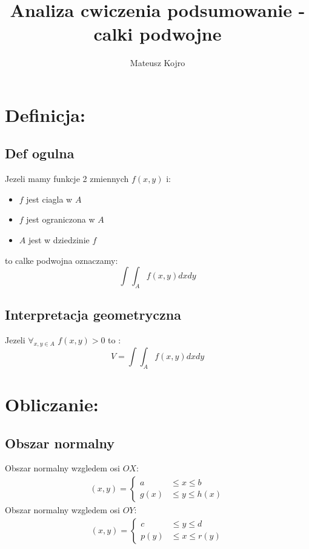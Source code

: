 \documentclass[options]{article}
\author{Mateusz Kojro}
\title{Analiza cwiczenia podsumowanie - calki podwojne}
\begin{document}
\maketitle
\section{Definicja:}
\subsection{Def ogulna}
\label{subsec:label}


Jezeli mamy funkcje 2 zmiennych $f(x,y)$ i: 
\begin{itemize}
\item $f$ jest ciagla w $A$
\item $f$ jest ograniczona w $A$
\item $A$ jest w dziedzinie $f$
\end{itemize}
to calke podwojna oznaczamy:
\begin{equation}
  \label{}
  \int \int_Af(x,y)dxdy
\end{equation}
\subsection{Interpretacja geometryczna}
Jezeli $ \forall_{x,y \in A}$ $f(x,y) > 0 $ to :
\begin{equation}
  \label{}
V = \int \int_{A} f(x,y)dxdy
\end{equation}
\clearpage
\section{Obliczanie:}
\subsection{Obszar normalny}
Obszar normalny wzgledem osi $OX$:
\begin{align}
  (x,y) =
  \begin{cases}
    a &\le x \le b \\
    g(x) &\le y \le h(x)
  \end{cases}
\end{align}
Obszar normalny wzgledem osi $OY$:
\begin{align}
  (x,y) =
  \begin{cases}
    c &\le y \le d \\
    p(y) &\le x \le r(y)
  \end{cases}
 \end{align}
\end{document}
